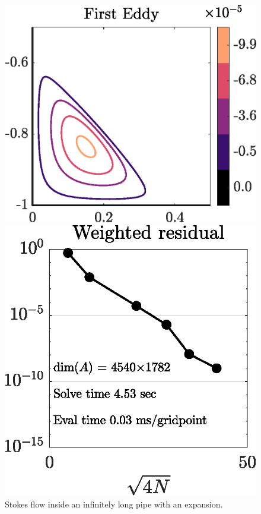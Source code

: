 \documentclass{article}
\begin{document}
\begin{figure}[H]
	\vspace{2em}
	\begin{minipage}{0.45\linewidth}
		\centering
		\includegraphics[width=\linewidth]{Figures/chan_eddy}
	\end{minipage}
	\hfill
	\begin{minipage}{0.45\linewidth}
		\centering
		\includegraphics[width=\linewidth]{Figures/chan_conv}
	\end{minipage}
	

	\caption{Stokes flow inside an infinitely long pipe with an expansion.}
	\label{fig:chan}
\end{figure} 
\end{document}
